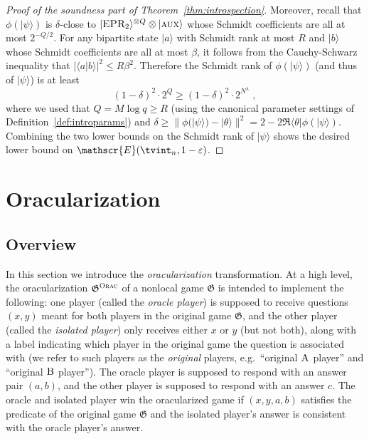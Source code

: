 \documentclass[11pt]{article}
\theoremstyle{definition}
\newcommand{\ket}[1]{|#1\rangle}
\newcommand{\bra}[1]{\langle#1|}
\newcommand{\eps}{\varepsilon}
\newcommand{\game}{\mathfrak{G}}
\newcommand{\sampler}{\mathcal{S}}
\newcommand{\decider}{\mathcal{D}}
\newcommand{\verifier}{\mathcal{V}}
\newcommand{\gamestyle}[1]{\ensuremath{\textsc{#1}}\xspace}
\newcommand{\ora}{\gamestyle{Orac}}
\newcommand{\labelstyle}[1]{\ensuremath{\textsc{#1}}\xspace}
\newcommand{\EPR}{\labelstyle{EPR}}
\newcommand{\aux}{\labelstyle{aux}}
\newcommand{\alice}{\labelstyle{A}}
\newcommand{\bob}{\labelstyle{B}}
\newcommand{\Ent}{\mathscr{E}}
\begin{document}
\begin{proof}[Proof of the soundness part of Theorem~\ref{thm:introspection}]
  Moreover, recall that $\phi(\ket{\psi})$ is $\delta$-close to
  $\ket{\EPR_2}^{\otimes Q} \otimes \ket{\aux}$ whose Schmidt coefficients are
  all at most $2^{-Q/2}$.
  For any bipartite state $\ket{a}$ with Schmidt rank at most $R$ and $\ket{b}$
  whose Schmidt coefficients are all at most $\beta$, it follows from the
  Cauchy-Schwarz inequality that $|\langle a | b \rangle|^2 \leq R \beta^2$.
  Therefore the Schmidt rank of $\phi(\ket{\psi})$ (and thus of $\ket{\psi}$) is
  at least
  \[
  	\left (1 - \delta \right)^2 \cdot 2^{Q} \geq \left
      (1 - \delta \right)^2 \cdot 2^{N^\lambda}\;,
  \]
  where we used that $Q = M \log q \geq R$ (using the canonical parameter
  settings of Definition~\ref{def:introparams}) and $\delta \geq \|
  \phi(\ket{\psi}) - \ket{\theta} \|^2 = 2 - 2\Re \bra{\theta}
  \phi(\ket{\psi})$.
  Combining the two lower bounds on the Schmidt rank of $\ket{\psi}$ shows the
  desired lower bound on $\Ent(\tvint_n,1 - \eps)$.
\end{proof}

 
\section{Oracularization}
\label{sec:oracle}

\newcommand{\tvora}{\hat{\verifier}^\ora}
\newcommand{\tsora}{\hat{\sampler}^\ora}
\newcommand{\tdora}{\hat{\decider}^\ora}

\subsection{Overview}

In this section we introduce the \emph{oracularization} transformation.
At a high level, the oracularization $\game^\ora$ of a nonlocal game $\game$ is
intended to implement the following: one player (called the \emph{oracle
  player}) is supposed to receive questions $(x,y)$ meant for both players in
the original game $\game$, and the other player (called the \emph{isolated
  player}) only receives either $x$ or $y$ (but not both), along with a label
indicating which player in the original game the question is associated with (we
refer to such players as the \emph{original} players, e.g.\ ``original $\alice$
player'' and ``original $\bob$ player'').
The oracle player is supposed to respond with an answer pair $(a,b)$, and the
other player is supposed to respond with an answer $c$.
The oracle and isolated player win the oracularized game if $(x,y,a,b)$
satisfies the predicate of the original game $\game$ and the isolated player's
answer is consistent with the oracle player's answer.
\end{document}
